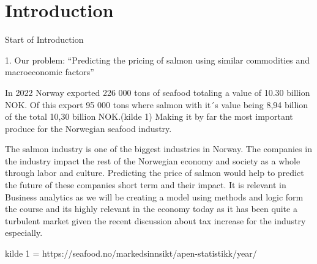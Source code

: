 \section{Introduction}

Start of Introduction

1. Our problem: “Predicting the pricing of salmon using similar commodities and macroeconomic factors” 

In 2022 Norway exported 226 000 tons of seafood totaling a value of 10.30 billion NOK. Of this export 95 000 tons where salmon with it´s value being 8,94 billion of the total 10,30 billion NOK.(kilde 1) Making it by far the most important produce for the Norwegian seafood industry.

The salmon industry is one of the biggest industries in Norway. The companies in the 	industry impact the rest of the Norwegian economy and society as a whole through labor and culture. Predicting the price of salmon would help to predict the future of these 	companies short term and their impact. 
It is relevant in Business analytics as we will be creating a model using methods and logic form the course and its highly relevant in the economy today as it has been quite a turbulent market given the recent discussion about tax increase for the industry especially.

kilde 1 = https://seafood.no/markedsinnsikt/apen-statistikk/year/
